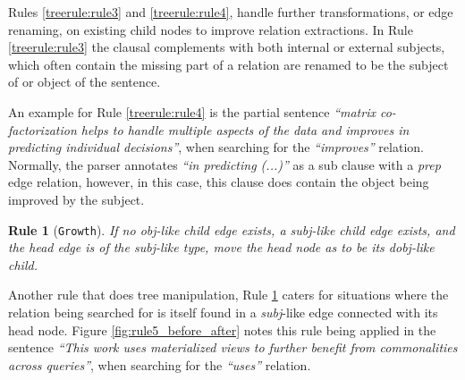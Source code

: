 \documentclass[11pt,a4paper,openright]{memoir}
\newtheorem{treerule}{Rule}
\begin{document}
Rules \ref{treerule:rule3} and \ref{treerule:rule4}, handle further transformations, or edge renaming, on existing child nodes to improve relation extractions. In Rule \ref{treerule:rule3} the clausal complements with both internal or external subjects, which often contain the missing part of a relation are renamed to be the subject of or object of the sentence.

An example for Rule \ref{treerule:rule4} is the partial sentence \emph{\enquote{matrix co-factorization helps to handle multiple aspects of the data and improves in predicting individual decisions}}, when searching for the \emph{\enquote{improves}} relation. Normally, the parser annotates \emph{\enquote{in predicting (...)}} as a sub clause with a \emph{prep} edge relation, however, in this case, this clause does contain the object being improved by the subject.

\begin{treerule}[\texttt{Growth}]
\label{treerule:rule5}
If no \emph{obj}-like child edge exists, a \emph{subj}-like child edge exists, and the head edge is of the \emph{subj}-like type, move the head node as to be its \emph{dobj}-like child.
\end{treerule}

Another rule that does tree manipulation, Rule \ref{treerule:rule5} caters for situations where the relation being searched for is itself found in a \emph{subj}-like edge connected with its head node. Figure \ref{fig:rule5_before_after} notes this rule being applied in the sentence \emph{\enquote{This work uses materialized views to further benefit from commonalities across queries}}, when searching for the \emph{\enquote{uses}} relation.
\end{document}
